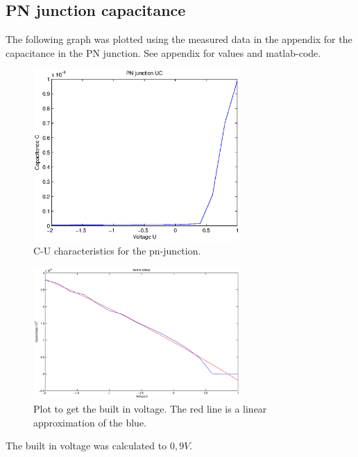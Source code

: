 \documentclass[a4paper]{article}
\begin{document}
\subsection{PN junction capacitance}
The following graph was plotted using the measured data in the appendix for the capacitance in the PN junction. See appendix for values and matlab-code. 
\begin{figure}[H]
	\centering
	\includegraphics[width=0.7\textwidth]{pn_cap.eps}
	\caption{C-U characteristics for the pn-junction.}	
	\label{pn_cap}
\end{figure}
\begin{figure}[H]
	\centering
	\includegraphics[width=0.7\textwidth]{built_in_v.eps}
	\caption{Plot to get the built in voltage. The red line is a linear approximation of the blue.}
	\label{pn_cap_built_in_v}
\end{figure}

The built in voltage was calculated to $0,9V$.
\end{document}
